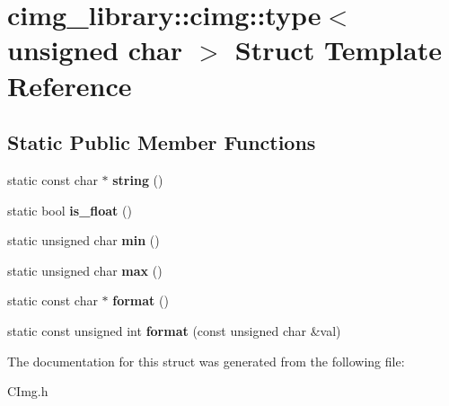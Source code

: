 \hypertarget{structcimg__library_1_1cimg_1_1type_3_01unsigned_01char_01_4}{\section{cimg\-\_\-library\-:\-:cimg\-:\-:type$<$ unsigned char $>$ Struct Template Reference}
\label{structcimg__library_1_1cimg_1_1type_3_01unsigned_01char_01_4}
}
\subsection*{Static Public Member Functions}
\begin{DoxyCompactItemize}
\item 
\hypertarget{structcimg__library_1_1cimg_1_1type_3_01unsigned_01char_01_4_ad9d0330388eda40399cbce3a3b32433c}{static const char $\ast$ {\bfseries string} ()}\label{structcimg__library_1_1cimg_1_1type_3_01unsigned_01char_01_4_ad9d0330388eda40399cbce3a3b32433c}

\item 
\hypertarget{structcimg__library_1_1cimg_1_1type_3_01unsigned_01char_01_4_a5e790ce09f0b17fd7b1ca1b90c206148}{static bool {\bfseries is\-\_\-float} ()}\label{structcimg__library_1_1cimg_1_1type_3_01unsigned_01char_01_4_a5e790ce09f0b17fd7b1ca1b90c206148}

\item 
\hypertarget{structcimg__library_1_1cimg_1_1type_3_01unsigned_01char_01_4_a2bd8888dcabb2d89db5236d7deebdc4e}{static unsigned char {\bfseries min} ()}\label{structcimg__library_1_1cimg_1_1type_3_01unsigned_01char_01_4_a2bd8888dcabb2d89db5236d7deebdc4e}

\item 
\hypertarget{structcimg__library_1_1cimg_1_1type_3_01unsigned_01char_01_4_a85d022899e295460ea70e4742e1074b7}{static unsigned char {\bfseries max} ()}\label{structcimg__library_1_1cimg_1_1type_3_01unsigned_01char_01_4_a85d022899e295460ea70e4742e1074b7}

\item 
\hypertarget{structcimg__library_1_1cimg_1_1type_3_01unsigned_01char_01_4_a3ccd278668de13dc206ad38508108274}{static const char $\ast$ {\bfseries format} ()}\label{structcimg__library_1_1cimg_1_1type_3_01unsigned_01char_01_4_a3ccd278668de13dc206ad38508108274}

\item 
\hypertarget{structcimg__library_1_1cimg_1_1type_3_01unsigned_01char_01_4_af48cbbda4d57dd838447036638d6b8a0}{static const unsigned int {\bfseries format} (const unsigned char \&val)}\label{structcimg__library_1_1cimg_1_1type_3_01unsigned_01char_01_4_af48cbbda4d57dd838447036638d6b8a0}

\end{DoxyCompactItemize}


The documentation for this struct was generated from the following file\-:\begin{DoxyCompactItemize}
\item 
C\-Img.\-h\end{DoxyCompactItemize}
